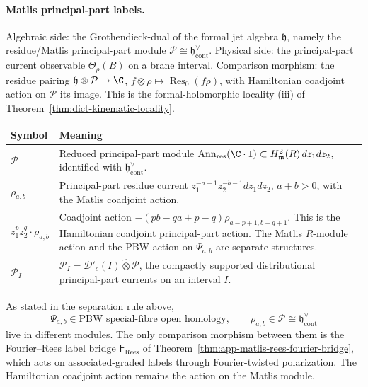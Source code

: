 \paragraph{Matlis principal-part labels.}
Algebraic side: the Grothendieck-dual of the formal jet algebra
\(\mathfrak h\), namely the residue/Matlis principal-part module
\(\mathcal P\cong\mathfrak h^\vee_{\mathrm{cont}}\).  Physical side:
the principal-part current observable \(\Theta_\rho(B)\) on a brane
interval.  Comparison morphism: the residue pairing
\(\mathfrak h\otimes\mathcal P\to\C\),
\(f\otimes\rho\mapsto\operatorname{Res}_0(f\rho)\), with Hamiltonian
coadjoint action on \(\mathcal P\) its image.  This is the
formal-holomorphic locality (iii) of
Theorem~\ref{thm:dict-kinematic-locality}.
\begin{center}
\begin{tabular}{@{}>{\raggedright\arraybackslash}p{}
  >{\raggedright\arraybackslash}p{}@{}}
\hline
\textbf{Symbol} & \textbf{Meaning}\\
\hline
\(\mathcal P\) &
Reduced principal-part module
\(\operatorname{Ann}_{\mathrm{res}}(\C\cdot1)\subset
H^2_{\mathfrak m}(R)\,dz_1dz_2\), identified with
\(\mathfrak h^\vee_{\mathrm{cont}}\).\\
\hline
\(\rho_{a,b}\) &
Principal-part residue current
\(z_1^{-a-1}z_2^{-b-1}dz_1dz_2\), \(a+b>0\), with the Matlis
coadjoint action.\\
\hline
\(z_1^p z_2^q\cdot\rho_{a,b}\) &
Coadjoint action
\(-(pb-qa+p-q)\rho_{a-p+1,b-q+1}\). This is the Hamiltonian coadjoint
principal-part action.  The Matlis \(R\)-module action and the PBW action
on \(\Psi_{a,b}\) are separate structures.\\
\hline
\(\mathcal P_I\) &
\(\mathcal P_I=\mathcal D'_c(I)\widehat\otimes\mathcal P\), the
compactly supported distributional principal-part currents on an interval
\(I\).\\
\hline
\end{tabular}
\end{center}

As stated in the separation rule above,
\[
  \Psi_{a,b}\in\text{PBW special-fibre open homology},\qquad
  \rho_{a,b}\in
  \mathcal P\cong\mathfrak h^\vee_{\mathrm{cont}}
\]
live in different modules.  The only comparison morphism between them
is the Fourier--Rees label bridge \(\mathsf F_{\mathrm{Rees}}\) of
Theorem~\ref{thm:app-matlis-rees-fourier-bridge}, which acts on
associated-graded labels through Fourier-twisted polarization.  The
Hamiltonian coadjoint action remains the action on the Matlis module.

